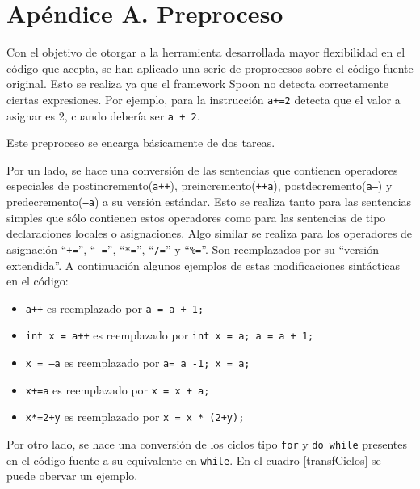 \documentclass{llncs}
\begin{document}
\section*{Apéndice A. \enspace Preproceso}\label{apend.A}
Con el objetivo de otorgar a la herramienta desarrollada mayor flexibilidad en el código que acepta, se han aplicado una serie de proprocesos sobre el código fuente
original. Esto se realiza ya que el framework Spoon no detecta correctamente ciertas expresiones. Por ejemplo, para la instrucción \texttt{a+=2} detecta que el valor
a asignar es 2, cuando debería ser \texttt{a + 2}.

Este preproceso se encarga básicamente de dos tareas.

Por un lado, se hace una conversión de las sentencias que contienen operadores especiales de postincremento(\texttt{a++}), preincremento(\texttt{++a}),
postdecremento(\texttt{a--}) y predecremento(\texttt{--a}) a su versión estándar. Esto se realiza tanto para las sentencias simples que sólo contienen estos operadores
como para las sentencias de tipo declaraciones locales o asignaciones. Algo similar se realiza para los operadores de asignación “\texttt{+=}”, “\texttt{-=}”, “\texttt{*=}”,
“\texttt{/=}” y “\texttt{\%=}”. Son reemplazados por su “versión extendida”. A continuación algunos ejemplos de estas modificaciones sintácticas en el código:
\begin{itemize}
  \item \texttt{a++} es reemplazado por \texttt{a = a + 1;}
  \item \texttt{int x = a++} es reemplazado por \texttt{int x = a; a = a + 1;}
  \item \texttt{x = --a} es reemplazado por \texttt{a= a -1; x = a;}
  \item \texttt{x+=a} es reemplazado por \texttt{x = x + a;}
  \item \texttt{x*=2+y} es reemplazado por \texttt{x = x * (2+y);}
\end{itemize}
Por otro lado, se hace una conversión de los ciclos tipo \texttt{for} y \texttt{do while} presentes en el código fuente a su equivalente en \texttt{while}. En el cuadro
\ref{transfCiclos} se puede obervar un ejemplo.
\end{document}
